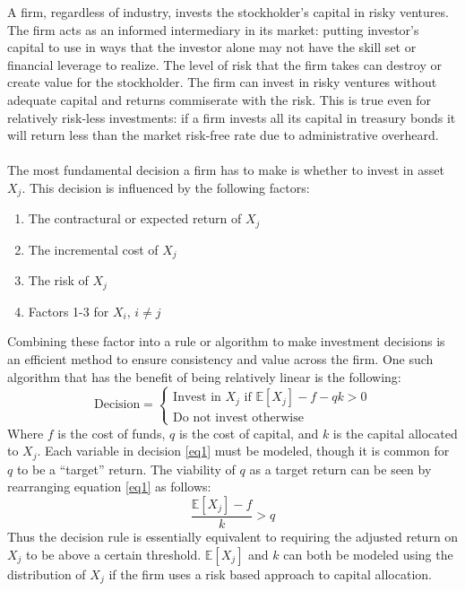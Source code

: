 \documentclass[12pt]{article}
\theoremstyle{definition}
\begin{document}
A firm, regardless of industry, invests the stockholder's capital in risky ventures.  The firm acts as an informed intermediary in its market: putting investor's capital to use in ways that the investor alone may not have the skill set or financial leverage to realize.  The level of risk that the firm takes can destroy or create value for the stockholder. The firm can invest in risky ventures without adequate capital and returns commiserate with the risk.  This is true even for relatively risk-less investments: if a firm invests all its capital in treasury bonds it will return less than the market risk-free rate due to administrative overheard.  
\\
\\
The most fundamental decision a firm has to make is whether to invest in asset \(X_j\).  This decision is influenced by the following factors: 
\begin{enumerate}
\item The contractural or expected return of \(X_j\)
\item The incremental cost of \(X_j\)
\item The risk of \(X_j\)
\item Factors 1-3 for \(X_i,\,i\neq j\)
\end{enumerate}

Combining these factor into a rule or algorithm to make investment decisions is an efficient method to ensure consistency and value across the firm.  One such algorithm that has the benefit of being relatively linear is the following:
\begin{equation} \label{eq1} \text{Decision} = \begin{cases} \text{Invest in } X_j \text{ if } \mathbb{E}[X_j]-f-qk>0 \\
\text{Do not invest otherwise}
\end{cases}\end{equation}
Where \(f\) is the cost of funds, \(q\) is the cost of capital, and \(k\) is the capital allocated to \(X_j\).  Each variable in decision \ref{eq1} must be modeled, though it is common for \(q\) to be a ``target'' return.  The viability of \(q\) as a target return can be seen by rearranging equation \ref{eq1} as follows:
\[\frac{\mathbb{E}[X_j]-f}{k}>q\]
Thus the decision rule is essentially equivalent to requiring the adjusted return on \(X_j\) to be above a certain threshold.  \(\mathbb{E}[X_j]\) and \(k\) can both be modeled using the distribution of \(X_j\) if the firm uses a risk based approach to capital allocation.  
\end{document}

